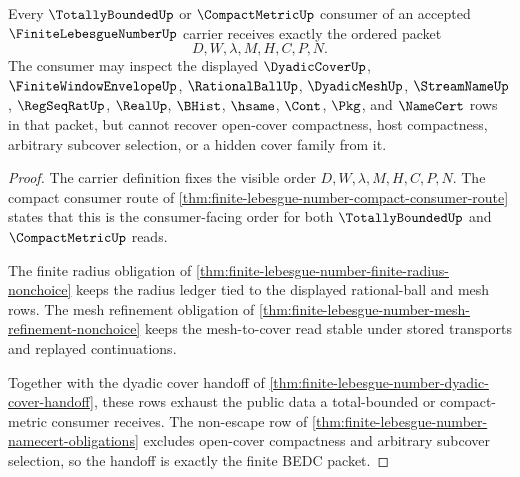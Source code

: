 \begin{theorem}
\label{thm:finite-lebesgue-number-total-bounded-handoff}
Every $\TotallyBoundedUp$ or $\CompactMetricUp$ consumer of an accepted $\FiniteLebesgueNumberUp$ carrier receives exactly the ordered packet
$$
D,W,\lambda,M,H,C,P,N .
$$
The consumer may inspect the displayed $\DyadicCoverUp$, $\FiniteWindowEnvelopeUp$, $\RationalBallUp$, $\DyadicMeshUp$, $\StreamNameUp$, $\RegSeqRatUp$, $\RealUp$, $\BHist$, $\hsame$, $\Cont$, $\Pkg$, and $\NameCert$ rows in that packet, but cannot recover open-cover compactness, host compactness, arbitrary subcover selection, or a hidden cover family from it.
\end{theorem}
\begin{proof}
The carrier definition fixes the visible order $D,W,\lambda,M,H,C,P,N$. The compact consumer route of \autoref{thm:finite-lebesgue-number-compact-consumer-route} states that this is the consumer-facing order for both $\TotallyBoundedUp$ and $\CompactMetricUp$ reads.

The finite radius obligation of \autoref{thm:finite-lebesgue-number-finite-radius-nonchoice} keeps the radius ledger tied to the displayed rational-ball and mesh rows. The mesh refinement obligation of \autoref{thm:finite-lebesgue-number-mesh-refinement-nonchoice} keeps the mesh-to-cover read stable under stored transports and replayed continuations.

Together with the dyadic cover handoff of \autoref{thm:finite-lebesgue-number-dyadic-cover-handoff}, these rows exhaust the public data a total-bounded or compact-metric consumer receives. The non-escape row of \autoref{thm:finite-lebesgue-number-namecert-obligations} excludes open-cover compactness and arbitrary subcover selection, so the handoff is exactly the finite BEDC packet.
\end{proof}

